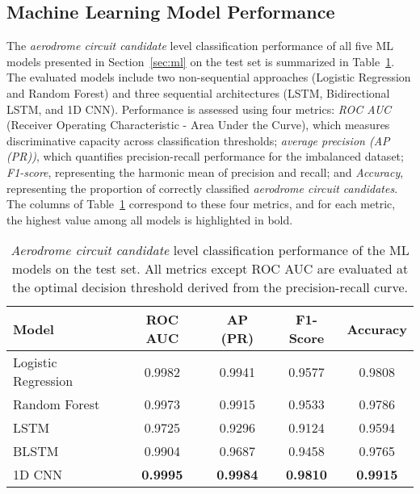 \documentclass[
  manuscript=proceedings,  %
  layout=preprint,         %
  year=2025,
  volume=x,
]{extra/joas}
\begin{document}
\subsection{Machine Learning Model Performance}
The \textit{aerodrome circuit candidate} level classification performance of all five ML models presented in Section~\ref{sec:ml} on the test set is summarized in Table~\ref{tab:performance_summary}. The evaluated models include two non-sequential approaches (Logistic Regression and Random Forest) and three sequential architectures (LSTM, Bidirectional LSTM, and 1D CNN). Performance is assessed using four metrics: \textit{ROC AUC} (Receiver Operating Characteristic - Area Under the Curve), which measures discriminative capacity across classification thresholds; \textit{average precision (AP (PR))}, which quantifies precision-recall performance for the imbalanced dataset; \textit{F1-score}, representing the harmonic mean of precision and recall; and \textit{Accuracy}, representing the proportion of correctly classified \textit{aerodrome circuit candidates}. The columns of Table~\ref{tab:performance_summary} correspond to these four metrics, and for each metric, the highest value among all models is highlighted in bold.

\begin{table}[h!]
\centering
\caption{\textit{Aerodrome circuit candidate} level classification performance of the ML models on the test set. All metrics except ROC AUC are evaluated at the optimal decision threshold derived from the precision-recall curve.}
\label{tab:performance_summary}
\begin{tabular}{lcccc}
\toprule
\textbf{Model}      & \textbf{ROC AUC} & \textbf{AP (PR)} & \textbf{F1-Score} & \textbf{Accuracy} \\
\midrule
Logistic Regression & 0.9982            & 0.9941            & 0.9577            & 0.9808 \\
Random Forest       & 0.9973            & 0.9915            & 0.9533            & 0.9786 \\
LSTM                & 0.9725            & 0.9296            & 0.9124            & 0.9594 \\
BLSTM               & 0.9904            & 0.9687            & 0.9458            & 0.9765 \\
1D CNN              & \textbf{0.9995}   & \textbf{0.9984}   & \textbf{0.9810}   & \textbf{0.9915} \\
\bottomrule
\end{tabular}
\end{table}
\end{document}
